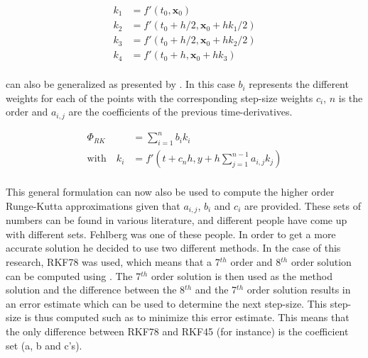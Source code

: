 \begin{equation} \label{eq:k}
\begin{split}
k_{1}&=f'\left(t_{0},\mathbf{x}_{0}\right)\\
k_{2}&=f'\left(t_{0}+h/2,\mathbf{x}_{0}+hk_{1}/2\right)\\
k_{3}&=f'\left(t_{0}+h/2,\mathbf{x}_{0}+hk_{2}/2\right)\\
k_{4}&=f'\left(t_{0}+h,\mathbf{x}_{0}+hk_{3}\right)\\
\end{split}
\end{equation}

 can also be generalized as presented by . In this case $b_{i}$ represents the different weights for each of the points with the corresponding step-size weights $c_{i}$, $n$ is the order and $a_{i,j}$ are the coefficients of the previous time-derivatives.

\begin{equation} \label{eq:generalRK}
\begin{split}
\Phi_{RK} &= \displaystyle \sum^{n}_{i=1}b_{i}k_{i} \\
\text{with}\quad k_{i} &= f'\left(t+c_{n}h,y+h\displaystyle \sum^{n-1}_{j=1}a_{i,j}k_{j} \right) \\
\end{split}
\end{equation}


This general formulation can now also be used to compute the higher order Runge-Kutta approximations given that $a_{i,j}$, $b_{i}$ and $c_{i}$ are provided. These sets of numbers can be found in various literature, and different people have come up with different sets. Fehlberg was one of these people. In order to get a more accurate solution he decided to use two different methods. In the case of this research, \ac{RKF78} was used, which means that a 7$^{th}$ order and 8$^{th}$ order solution can be computed using . The 7$^{th}$ order solution is then used as the method solution and the difference between the 8$^{th}$ and the 7$^{th}$ order solution results in an error estimate which can be used to determine the next step-size. This step-size is thus computed such as to minimize this error estimate. This means that the only difference between \ac{RKF78} and \ac{RKF45} (for instance) is the coefficient set (a, b and c's). 









